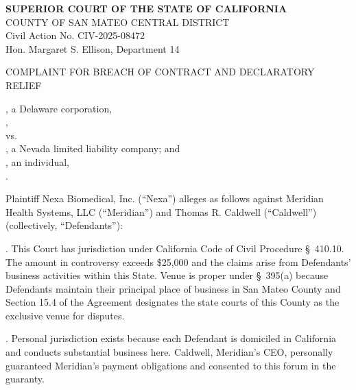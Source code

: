 \documentclass[12pt,letterpaper]{article}
\newcommand{\pleadingheader}[4]{%
  \begin{tcolorbox}[headerbox]
    {\fontsize{13pt}{16pt}\selectfont\bfseries\color{CourtBlue}#1}\\[3pt]
    {\footnotesize\color{RuleGray}#2}\\[2pt]
    {\footnotesize\color{RuleGray}#3}\\[2pt]
    {\footnotesize\color{RuleGray}#4}
  \end{tcolorbox}
}
\newcommand{\captionblock}[1]{%
  \begin{tcolorbox}[rulingbox]
    {\footnotesize\color{LineGray}\MakeUppercase{#1}}
  \end{tcolorbox}
}
\begin{document}
\thispagestyle{fancy}

\pleadingheader
  {SUPERIOR COURT OF THE STATE OF CALIFORNIA}
  {COUNTY OF SAN MATEO \textemdash{} CENTRAL DISTRICT}
  {Civil Action No. CIV-2025-08472}
  {Hon. Margaret S. Ellison, Department 14}

\captionblock{Complaint for Breach of Contract and Declaratory Relief}

, a Delaware corporation,\\[2pt]
\hspace*{1.5em}{\itshape Plaintiff},\\[8pt]
\noindent vs.\\[8pt]
, a Nevada limited liability company; and\\[1pt]
, an individual,\\[2pt]
\hspace*{1.5em}{\itshape Defendants}.

\vspace{8pt}


\noindent Plaintiff Nexa Biomedical, Inc. (\textquotedblleft Nexa\textquotedblright) alleges as follows against Meridian Health Systems, LLC (\textquotedblleft Meridian\textquotedblright) and Thomas R. Caldwell (\textquotedblleft Caldwell\textquotedblright) (collectively, \textquotedblleft Defendants\textquotedblright):


.\hspace{0.5em} This Court has jurisdiction under California Code of Civil Procedure \S\ 410.10. The amount in controversy exceeds \$25,000 and the claims arise from Defendants' business activities within this State. Venue is proper under \S\ 395(a) because Defendants maintain their principal place of business in San Mateo County and Section 15.4 of the Agreement designates the state courts of this County as the exclusive venue for disputes.

.\hspace{0.5em} Personal jurisdiction exists because each Defendant is domiciled in California and conducts substantial business here. Caldwell, Meridian's CEO, personally guaranteed Meridian's payment obligations and consented to this forum in the guaranty.
\end{document}
